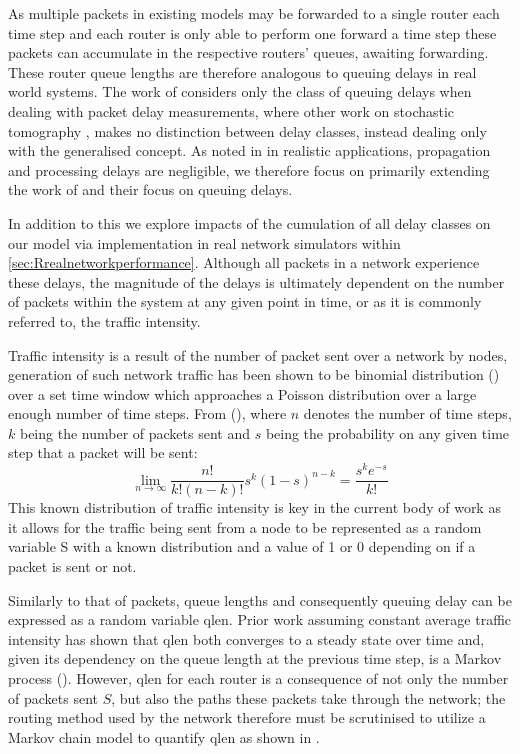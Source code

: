 As multiple packets in existing models may be forwarded to a single router each time step and each router is only able to perform one forward a time step these packets can accumulate in the respective routers’ queues, awaiting forwarding. These router queue lengths are therefore analogous to queuing delays in real world systems. The work of \cite{barnes_stochastic_2020} considers only the class of queuing delays when dealing with packet delay measurements, where other work on stochastic tomography \cite{kolar_distributed_2020}, \cite{he_fisher_2015} makes no distinction between delay classes, instead dealing only with the generalised concept. As noted in \cite{telchemy_impact_2006} in realistic applications, propagation and processing delays are negligible, we therefore focus on primarily extending the work of \cite{barnes_stochastic_2020} and their focus on queuing delays.\par
In addition to this we explore impacts of the cumulation of all delay classes on our model via implementation in real network simulators within \cref{sec:Rrealnetworkperformance}. Although all packets in a network experience these delays, the magnitude of the delays is ultimately dependent on the number of packets within the system at any given point in time, or as it is commonly referred to, the traffic intensity.\par
Traffic intensity is a result of the number of packet sent over a network by nodes, generation of such network traffic has been shown to be binomial distribution (\cite{barnes_stochastic_2020}) over a set time window which approaches a Poisson distribution over a large enough number of time steps. From (\cite{barnes_stochastic_2020}), where $n$ denotes the number of time steps, $k$ being the number of packets sent and $s$ being the probability on any given time step that a packet will be sent:
\[\lim_{n\to\infty} \frac{n!}{k!(n-k)!}s^k (1-s)^{n-k} =\frac{s^k e^{-s}}{k!}\]
This known distribution of traffic intensity is key in the current body of work as it allows for the traffic being sent from a node to be represented as a random variable S with a known distribution and a value of 1 or 0 depending on if a packet is sent or not. \par
Similarly to that of packets, queue lengths and consequently queuing delay can be expressed as a random variable \gls{qlen}. Prior work assuming constant average traffic intensity has shown that \gls{qlen} both converges to a steady state over time and, given its dependency on the queue length at the previous time step, is a Markov process (\cite{barnes_stochastic_2020}). However, \gls{qlen} for each router is a consequence of not only the number of packets sent $S$, but also the paths these packets take through the network; the routing method used by the network therefore must be scrutinised to utilize a Markov chain model to quantify \gls{qlen} as shown in \cite{barnes_stochastic_2020}.\par
